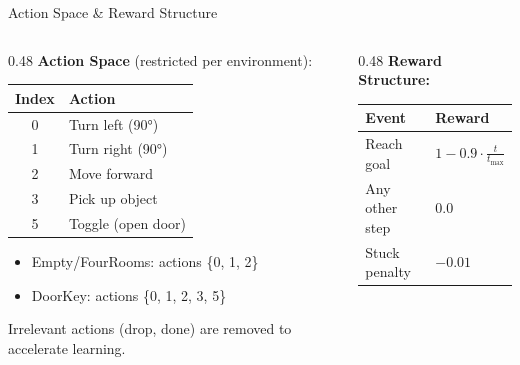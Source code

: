 \documentclass[11pt,aspectratio=169]{beamer}
\begin{document}
\begin{frame}{Action Space \& Reward Structure}
    \begin{columns}
    \begin{column}{0.48\textwidth}
        \textbf{Action Space} (restricted per environment):

        \vspace{0.2cm}
        \begin{table}[h]
        \centering
        \small
        \begin{tabular}{cl}
            \toprule
            \textbf{Index} & \textbf{Action} \\
            \midrule
            0 & Turn left (90°) \\
            1 & Turn right (90°) \\
            2 & Move forward \\
            3 & Pick up object \\
            5 & Toggle (open door) \\
            \bottomrule
        \end{tabular}
        \end{table}

        \vspace{0.1cm}
        \small
        \begin{itemize}
            \item Empty/FourRooms: actions \{0, 1, 2\}
            \item DoorKey: actions \{0, 1, 2, 3, 5\}
        \end{itemize}
        Irrelevant actions (drop, done) are removed to accelerate learning.
    \end{column}
    \begin{column}{0.48\textwidth}
        \textbf{Reward Structure:}

        \vspace{0.2cm}
        \begin{table}[h]
        \centering
        \small
        \begin{tabular}{p{2.5cm}l}
            \toprule
            \textbf{Event} & \textbf{Reward} \\
            \midrule
            Reach goal & $1 - 0.9 \cdot \frac{t}{t_{\max}}$ \\
            Any other step & $0.0$ \\
            Stuck penalty & $-0.01$ \\
            \bottomrule
        \end{tabular}
        \end{table}


\end{column}
\end{columns}
\end{frame}
\end{document}
